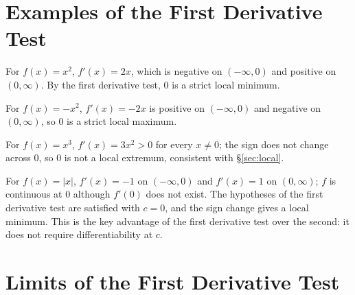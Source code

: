 \documentclass{essay}
\begin{document}
\section{Examples of the First Derivative Test}

\begin{example}
  For \(f(x)=x^{2}\), \(f'(x)=2x\), which is negative on \((-\infty,0)\) and
  positive on \((0,\infty)\). By the first derivative test, \(0\) is a strict
  local minimum.
\end{example}

\begin{example}
  For \(f(x)=-x^{2}\), \(f'(x)=-2x\) is positive on \((-\infty,0)\) and negative
  on \((0,\infty)\), so \(0\) is a strict local maximum.
\end{example}

\begin{example}
  For \(f(x)=x^{3}\), \(f'(x)=3x^{2}>0\) for every \(x\neq 0\); the sign does not
  change across \(0\), so \(0\) is not a local extremum, consistent with
  \S\ref{sec:local}.
\end{example}

\begin{example}
  For \(f(x)=|x|\), \(f'(x)=-1\) on \((-\infty,0)\) and \(f'(x)=1\) on
  \((0,\infty)\); \(f\) is continuous at \(0\) although \(f'(0)\) does not
  exist. The hypotheses of the first derivative test are satisfied with
  \(c=0\), and the sign change gives a local minimum. This is the key
  advantage of the first derivative test over the second: it does not require
  differentiability at \(c\).
\end{example}

\section{Limits of the First Derivative Test}
\end{document}
